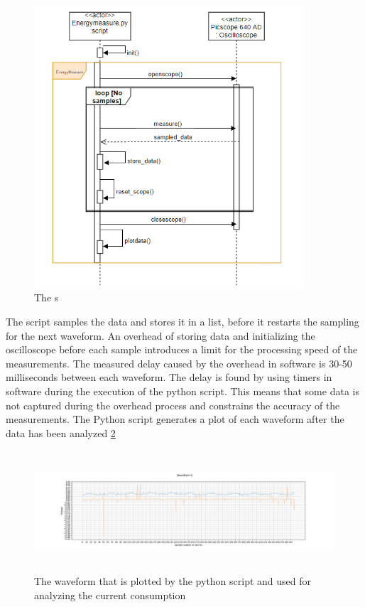 \begin{figure}[H]
\centering
\includegraphics[height=10.5cm]{Project_Report/Images/Sequence_diagram.PNG}
\caption{The s}
\label{fig:sequence}
\end{figure}
 

 The script samples the data and stores it in a list, before it restarts the sampling for the next waveform. An overhead of storing data and initializing the oscilloscope before each sample introduces a limit for the processing speed of the measurements. The measured delay caused by the overhead in software is 30-50 milliseconds between each waveform. The delay is found by using timers in software during the execution of the python script. This means that some data is not captured during the overhead process and constrains the accuracy of the measurements.
The Python script generates a plot of each waveform after the data has been analyzed \ref{fig:pythonwaveform}

\begin{figure}[H]
\centering
\includegraphics[height=4.5cm]{Project_Report/Images/pythonwaveform.png}
\caption{The waveform that is plotted by the python script and used for analyzing the current consumption}
\label{fig:pythonwaveform}
\end{figure}
 
